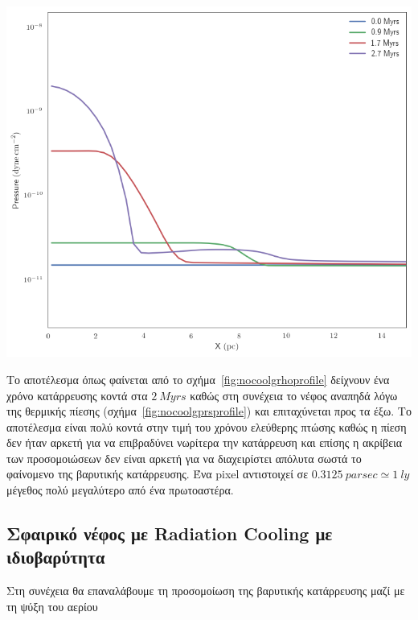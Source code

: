 \begin{marginfigure}
	\centering
	\includegraphics[width=1\linewidth]{DataImages/NoCoolGPRSprofile.png}
	\caption{}
	\label{fig:nocoolgprsprofile}
\end{marginfigure}

Το αποτέλεσμα όπως φαίνεται από το σχήμα~\ref{fig:nocoolgrhoprofile} δείχνουν ένα χρόνο κατάρρευσης κοντά στα $\SI{2}{Myrs}$ καθώς στη συνέχεια το νέφος αναπηδά λόγω της θερμικής πίεσης (σχήμα~\ref{fig:nocoolgprsprofile}) και επιταχύνεται προς τα έξω.
Το αποτέλεσμα είναι πολύ κοντά στην τιμή του χρόνου ελεύθερης πτώσης καθώς η πίεση δεν ήταν αρκετή για να επιβραδύνει νωρίτερα την κατάρρευση και επίσης η ακρίβεια των προσομοιώσεων δεν είναι αρκετή για να διαχειρίστει απόλυτα σωστά το φαίνομενο της βαρυτικής κατάρρευσης. Ένα pixel αντιστοιχεί σε $\SI{0.3125}{parsec}\simeq \SI{1}{ly}$ μέγεθος πολύ μεγαλύτερο από ένα πρωτοαστέρα.

\subsection{Σφαιρικό νέφος με Radiation Cooling με ιδιοβαρύτητα}

Στη συνέχεια θα επαναλάβουμε τη προσομοίωση της βαρυτικής κατάρρευσης μαζί με τη ψύξη του αερίου

